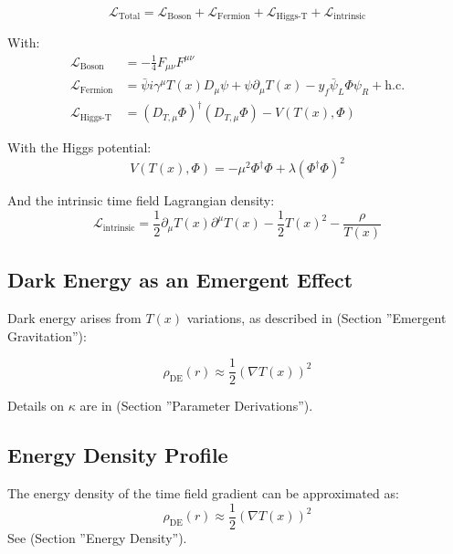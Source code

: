 \documentclass[a4paper,12pt]{article}
\theoremstyle{definition}
\theoremstyle{remark}
\newcommand{\Tfield}{T(x)}
\newcommand{\DcovT}[1]{\Tfield D_\mu #1 + #1 \partial_\mu \Tfield}
\begin{document}
	\begin{equation}
		\mathcal{L}_{\text{Total}} = \mathcal{L}_{\text{Boson}} + \mathcal{L}_{\text{Fermion}} + \mathcal{L}_{\text{Higgs-T}} + \mathcal{L}_{\text{intrinsic}}
	\end{equation}
	
	With:
	\begin{align}
		\mathcal{L}_{\text{Boson}} &= -\frac{1}{4} F_{\mu\nu} F^{\mu\nu} \\
		\mathcal{L}_{\text{Fermion}} &= \bar{\psi} i \gamma^\mu \DcovT{\psi} - y_f \bar{\psi}_L \Phi \psi_R + \text{h.c.} \\
		\mathcal{L}_{\text{Higgs-T}} &= (D_{T,\mu} \Phi)^\dagger (D_{T,\mu} \Phi) - V(\Tfield, \Phi)
	\end{align}
	
	With the Higgs potential:
	\begin{equation}
		V(\Tfield, \Phi) = -\mu^2 \Phi^\dagger \Phi + \lambda (\Phi^\dagger \Phi)^2
	\end{equation}
	
	And the intrinsic time field Lagrangian density:
	\begin{equation}
		\mathcal{L}_{\text{intrinsic}} = \frac{1}{2} \partial_\mu \Tfield \partial^\mu \Tfield - \frac{1}{2}\Tfield^2 - \frac{\rho}{\Tfield}
	\end{equation}
	
	\subsection{Dark Energy as an Emergent Effect}
	
	Dark energy arises from \(\Tfield\) variations, as described in \cite{pascher_galaxies_2025} (Section ''Emergent Gravitation''):
	
	\begin{equation}
		\rho_{\text{DE}}(r) \approx \frac{1}{2} (\nabla \Tfield)^2
	\end{equation}
	
	Details on \(\kappa\) are in \cite{pascher_params_2025} (Section ''Parameter Derivations'').
	
	\subsection{Energy Density Profile}
	
	The energy density of the time field gradient can be approximated as:
	\begin{equation}
		\rho_{\text{DE}}(r) \approx \frac{1}{2} (\nabla \Tfield)^2
	\end{equation}
	See \cite{pascher_galaxies_2025} (Section ''Energy Density'').
	
\end{document}
